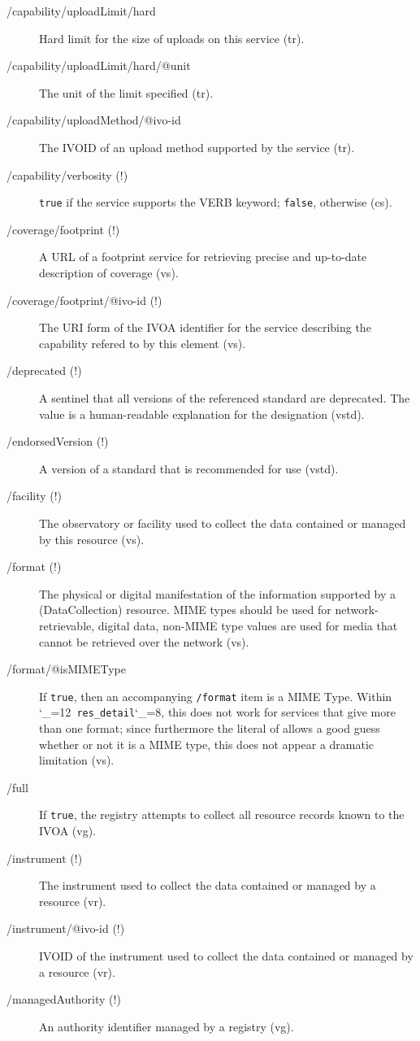 \documentclass[11pt,a4paper]{ivoa}
\makeatletter
\def\rtent#1{\texttt{\color{rtcolor}\verb|#1|}}
\def\makeunderscoreletter{\catcode`\_=12}
\def\makeunderscoresubscript{\catcode`\_=8}
\def\rtent{\makeunderscoreletter\relax\rt@nt}
\def\rt@nt#1{\texttt{\color{rtcolor} #1}\makeunderscoresubscript{}}
\makeatother
\begin{document}
\begin{description}
\item[/capability/uploadLimit/hard]Hard limit for the size of uploads on this service (tr).
\item[/capability/uploadLimit/hard/@unit]The unit of the limit specified (tr).
\item[/capability/uploadMethod/@ivo-id]The IVOID of an upload method supported by the service (tr).
\item[/capability/verbosity (!)]\texttt{true} if the service supports the VERB keyword; \texttt{false}, otherwise (cs).
\item[/coverage/footprint (!)]A URL of a footprint service for retrieving precise and up-to-date description of coverage (vs).
\item[/coverage/footprint/@ivo-id (!)]The URI form of the IVOA identifier for the service describing the capability refered to by this element (vs).
\item[/deprecated (!)]A sentinel that all versions of the referenced standard are deprecated. The value is a human-readable explanation for the designation (vstd).
\item[/endorsedVersion (!)]A version of a standard that is recommended for use (vstd).
\item[/facility (!)]The observatory or facility used to collect the data contained or managed by this resource (vs).
\item[/format (!)]The physical or digital manifestation of the information supported by a (DataCollection) resource.  MIME types should be used for network-retrievable, digital data, non-MIME type values are used for media that cannot be retrieved over the network (vs).
\item[/format/@isMIMEType]If \texttt{true}, then an accompanying \texttt{/format} item is a MIME Type. Within \rtent{res_detail}, this does not work for services that give more than one format; since furthermore the literal of  allows a good guess whether or not it is a MIME type, this does not appear a dramatic limitation (vs).
\item[/full]If \verb|true|, the registry attempts to collect all resource records known to the IVOA (vg).
\item[/instrument (!)]The instrument used to collect the data contained or managed by a resource (vr).
\item[/instrument/@ivo-id (!)]IVOID of the instrument used to collect the data contained or managed by a resource (vr).
\item[/managedAuthority (!)]An authority identifier managed by a registry (vg).

\end{description}
\end{document}
